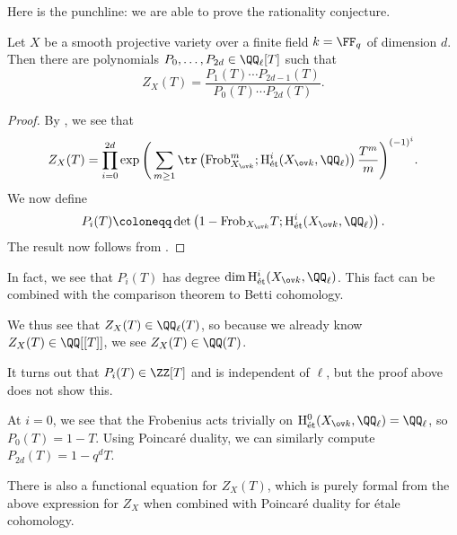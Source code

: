 \documentclass[../notes.tex]{subfiles}
\begin{document}
Here is the punchline: we are able to prove the rationality conjecture.
\begin{proposition}[Rationality]
	Let $X$ be a smooth projective variety over a finite field $k=\FF_q$ of dimension $d$. Then there are polynomials $P_0,\ldots,P_{2d}\in\QQ_\ell[T]$ such that
	\[Z_X(T)=\frac{P_1(T)\cdots P_{2d-1}(T)}{P_0(T)\cdots P_{2d}(T)}.\]
\end{proposition}
\begin{proof}
	By , we see that
	\[Z_X(T)=\prod_{i=0}^{2d}\exp\Bigg(\sum_{m\ge1}\tr\left(\mathrm{Frob}_{X_{\ov k}}^m;\mathrm H^i_{\mathrm{\acute et}}(X_{\ov k},\QQ_\ell)\right)\frac{T^m}m\Bigg)^{(-1)^i}.\]
	We now define
	\[P_i(T)\coloneqq\det\left(1-\mathrm{Frob}_{X_{\ov k}}T;\mathrm H^i_{\mathrm{\acute et}}(X_{\ov k},\QQ_\ell)\right).\]
	The result now follows from .
\end{proof}
\begin{remark}
	In fact, we see that $P_i(T)$ has degree $\dim \mathrm H^i_{\mathrm{\acute et}}(X_{\ov k},\QQ_\ell)$. This fact can be combined with the comparison theorem to Betti cohomology.
\end{remark}
\begin{remark}
	We thus see that $Z_X(T)\in\QQ_\ell(T)$, so because we already know $Z_X(T)\in\QQ[[T]]$, we see $Z_X(T)\in\QQ(T)$.
\end{remark}
\begin{remark}
	It turns out that $P_i(T)\in\ZZ[T]$ and is independent of $\ell$, but the proof above does not show this.
\end{remark}
\begin{example}
	At $i=0$, we see that the Frobenius acts trivially on $\mathrm H^0_{\mathrm{\acute et}}(X_{\ov k},\QQ_\ell)=\QQ_\ell$, so $P_0(T)=1-T$. Using Poincar\'e duality, we can similarly compute $P_{2d}(T)=1-q^{d}T$.
\end{example}
\begin{remark}
	There is also a functional equation for $Z_X(T)$, which is purely formal from the above expression for $Z_X$ when combined with Poincar\'e duality for \'etale cohomology.
\end{remark}
\end{document}
